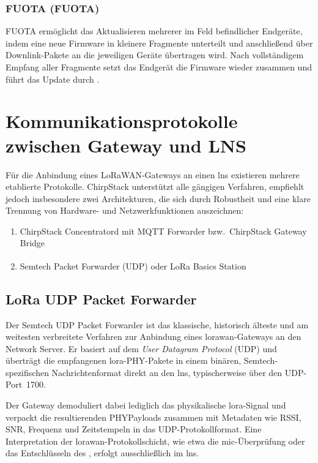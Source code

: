 \subsubsection{\acl{FUOTA} (\acs{FUOTA})}
	\ac{FUOTA} ermöglicht das Aktualisieren mehrerer im Feld befindlicher Endgeräte, indem eine neue Firmware in kleinere Fragmente unterteilt und anschlie{\ss}end über Downlink-Pakete an die jeweiligen Geräte übertragen wird. Nach vollständigem Empfang aller Fragmente setzt das Endgerät die Firmware wieder zusammen und führt das Update durch \cite{USMB:2022}.



\section{Kommunikationsprotokolle zwischen Gateway und LNS}

	Für die Anbindung eines LoRaWAN-Gateways an einen \ac{lns} existieren mehrere etablierte Protokolle. ChirpStack unterstützt alle gängigen Verfahren, empfiehlt jedoch insbesondere zwei Architekturen, die sich durch Robustheit und eine klare Trennung von Hardware- und Netzwerkfunktionen auszeichnen:

	\begin{enumerate}
		\item ChirpStack Concentratord mit MQTT Forwarder bzw.\ ChirpStack Gateway Bridge
		\item Semtech Packet Forwarder (UDP) oder LoRa Basics\textsuperscript{\texttrademark} Station
	\end{enumerate}

\subsection{LoRa UDP Packet Forwarder}

	Der Semtech UDP Packet Forwarder ist das klassische, historisch älteste und am weitesten verbreitete Verfahren zur Anbindung eines \acs{lorawan}-Gateways an den Network Server. Er basiert auf dem \textit{User Datagram Protocol} (UDP) und überträgt die empfangenen \acs{lora}-PHY-Pakete in einem binären, Semtech-spezifischen Nachrichtenformat direkt an den \acs{lns}, typischerweise über den UDP-Port~1700.

	Der Gateway demoduliert dabei lediglich das physikalische \acs{lora}-Signal und verpackt die resultierenden PHYPayloads zusammen mit Metadaten wie RSSI, SNR, Frequenz und Zeitstempeln in das UDP-Protokollformat. Eine Interpretation der \acs{lorawan}-Protokollschicht, wie etwa die \acs{mic}-Überprüfung oder das Entschlüsseln des , erfolgt ausschlie{\ss}lich im \acs{lns}.

